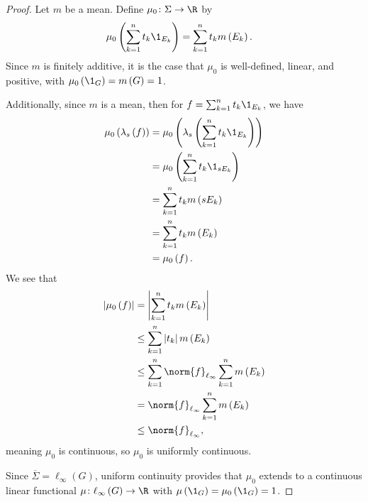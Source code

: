 \begin{proof}
  Let $m$ be a mean. Define $\mu_0\colon \Sigma\rightarrow \R$ by
  \begin{align*}
    \mu_0\left(\sum_{k=1}^{n}t_k\1_{E_k}\right) &= \sum_{k=1}^{n}t_km\left(E_k\right).
  \end{align*}
  Since $m$ is finitely additive, it is the case that $\mu_0$ is well-defined, linear, and positive, with $\mu_0\left(\1_{G}\right) = m\left(G\right) = 1$.\newline

  Additionally, since $m$ is a mean, then for $f = \sum_{k=1}^{n}t_k\1_{E_k}$, we have
  \begin{align*}
    \mu_0\left(\lambda_s\left(f\right)\right) &= \mu_0\left(\lambda_s\left(\sum_{k=1}^{n}t_k\1_{E_k}\right)\right)\\
                                              &= \mu_0\left(\sum_{k=1}^{n}t_k\1_{sE_k}\right)\\
                                              &= \sum_{k=1}^{n}t_km\left(sE_k\right)\\
                                              &= \sum_{k=1}^{n}t_km\left(E_k\right)\\
                                              &= \mu_0\left(f\right).
  \end{align*}
  We see that
  \begin{align*}
    \left\vert \mu_0\left(f\right) \right\vert &= \left\vert \sum_{k=1}^{n}t_km\left(E_k\right) \right\vert\\
                                               &\leq \sum_{k=1}^{n}\left\vert t_k \right\vert m\left(E_k\right)\\
                                               &\leq \sum_{k=1}^{n}\norm{f}_{\ell_{\infty}}\sum_{k=1}^{n}m\left(E_k\right)\\
                                               &= \norm{f}_{\ell_{\infty}}\sum_{k=1}^{n}m\left(E_k\right)\\
                                               &\leq \norm{f}_{\ell_{\infty}},
  \end{align*}
  meaning $\mu_0$ is continuous, so $\mu_0$ is uniformly continuous.\newline

  Since $\overline{\Sigma} = \ell_{\infty}\left(G\right)$, uniform continuity provides that $\mu_0$ extends to a continuous linear functional $\mu\colon \ell_{\infty}\left(G\right)\rightarrow \R$ with $\mu\left(\1_{G}\right) = \mu_0\left(\1_{G}\right) = 1$.\newline


\end{proof}
